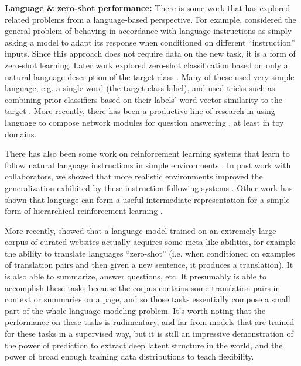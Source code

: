 \textbf{Language \& zero-shot performance:} There is some work that has explored related problems from a language-based perspective. For example, \citet{Larochelle2008} considered the general problem of behaving in accordance with language instructions as simply asking a model to adapt its response when conditioned on different ``instruction'' inputs. Since this approach does not require data on the new task, it is a form of zero-shot learning. Later work explored zero-shot classification based on only a natural language description of the target class \citep{Socher2013,Romera-Paredes2015, Xian2018}. Many of these used very simple language, e.g. a single word (the target class label), and used tricks such as combining prior classifiers based on their labels' word-vector-similarity to the target \citep[e.g.]{Norouzi2014, Changpinyo2016}. More recently, there has been a productive line of research in using language to compose network modules for question answering \citep{Andreas, Andreasa}, at least in toy domains. \par
There has also been some work on reinforcement learning systems that learn to follow natural language instructions in simple environments \citep{Hermann2017, Oh2017a}. In past work with collaborators, we showed that more realistic environments improved the generalization exhibited by these instruction-following systems \citep{Hill2019a}. Other work has shown that language can form a useful intermediate representation for a simple form of hierarchical reinforcement learning \citep{Jiang2019}. \par
More recently, \citet{Radford2019} showed that a language model trained on an extremely large corpus of curated websites actually acquires some meta-like abilities, for example the ability to translate languages ``zero-shot'' (i.e. when conditioned on examples of translation pairs and then given a new sentence, it produces a translation). It is also able to summarize, answer questions, etc. It presumably is able to accomplish these tasks because the corpus contains some translation pairs in context or summaries on a page, and so those tasks essentially compose a small part of the whole language modeling problem. It's worth noting that the performance on these tasks is rudimentary, and far from models that are trained for these tasks in a supervised way, but it is still an impressive demonstration of the power of prediction to extract deep latent structure in the world, and the power of broad enough training data distributions to teach flexibility. \par  

